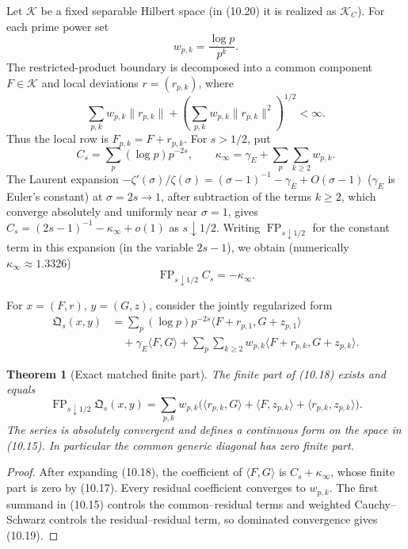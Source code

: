 \documentclass[11pt]{amsart}
\newtheorem{theorem}{Theorem}[section]
\theoremstyle{definition}
\theoremstyle{remark}
\begin{document}
Let \(\mathscr K\) be a fixed separable Hilbert space (in (10.20) it is realized as \(\mathscr K_C\)).  For each
prime power set
\[
 w_{p,k}=\frac{\log p}{p^k}.
 \tag{10.14}
\]
The restricted-product boundary is decomposed into a common component
\(F\in\mathscr K\) and local deviations \(r=(r_{p,k})\), where
\[
 \sum_{p,k}w_{p,k}\|r_{p,k}\|
 +\left(\sum_{p,k}w_{p,k}\|r_{p,k}\|^2\right)^{1/2}<\infty.
 \tag{10.15}
\]
Thus the local row is \(F_{p,k}=F+r_{p,k}\).  For \(s>1/2\), put
\[
 C_s=\sum_p(\log p)p^{-2s},
 \qquad
 \kappa_\infty=\gamma_E+\sum_p\sum_{k\ge2}w_{p,k}.
 \tag{10.16}
\]
The Laurent expansion \(-\zeta'(\sigma)/\zeta(\sigma)=(\sigma-1)^{-1}-\gamma_E+O(\sigma-1)\)
(\(\gamma_E\) is Euler's constant)
at \(\sigma=2s\to1\), after subtraction of the terms \(k\ge2\), which
converge absolutely and uniformly near \(\sigma=1\), gives
\(C_s=(2s-1)^{-1}-\kappa_\infty+o(1)\) as \(s\downarrow1/2\).  Writing
\(\operatorname{FP}_{s\downarrow1/2}\) for the constant term in this
expansion (in the variable \(2s-1\)), we obtain
(numerically \(\kappa_\infty\approx1.3326\))
\[
 \operatorname{FP}_{s\downarrow1/2}C_s=-\kappa_\infty.
 \tag{10.17}
\]

For \(x=(F,r)\), \(y=(G,z)\), consider the jointly regularized form
\[
 \begin{aligned}
 \mathfrak Q_s(x,y)
 &=\sum_p(\log p)p^{-2s}
   \langle F+r_{p,1},G+z_{p,1}\rangle\\
 &\quad+\gamma_E\langle F,G\rangle
 +\sum_p\sum_{k\ge2}w_{p,k}
   \langle F+r_{p,k},G+z_{p,k}\rangle.
 \end{aligned}
 \tag{10.18}
\]

\begin{theorem}[Exact matched finite part]
\label{thm:matched-finite-part}
The finite part of (10.18) exists and equals
\[
 \boxed{
 \operatorname{FP}_{s\downarrow1/2}\mathfrak Q_s(x,y)
 =\sum_{p,k}w_{p,k}
 \bigl(
 \langle r_{p,k},G\rangle
 +\langle F,z_{p,k}\rangle
 +\langle r_{p,k},z_{p,k}\rangle
 \bigr).}
 \tag{10.19}
\]
The series is absolutely convergent and defines a continuous form on the
space in (10.15).  In particular the common generic diagonal has zero
finite part.
\end{theorem}

\begin{proof}
After expanding (10.18), the coefficient of \(\langle F,G\rangle\) is
\(C_s+\kappa_\infty\), whose finite part is zero by (10.17).  Every
residual coefficient converges to \(w_{p,k}\).  The first summand in
(10.15) controls the common--residual terms and weighted
Cauchy--Schwarz controls the residual--residual term, so dominated
convergence gives (10.19).
\end{proof}
\end{document}
